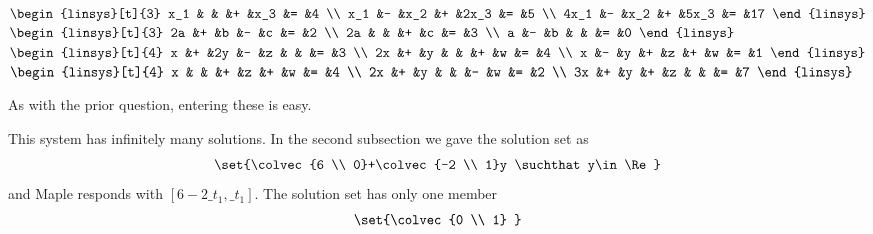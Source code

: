 \begin{exercises}
\begin{exparts*}
      \partsitem \( \begin{linsys}[t]{3}
                   x_1  &   &     &+  &x_3   &=  &4  \\
                   x_1  &-  &x_2  &+  &2x_3  &=  &5  \\
                  4x_1  &-  &x_2  &+  &5x_3  &=  &17  
                   \end{linsys}  \)
      \partsitem \( \begin{linsys}[t]{3}
                   2a   &+  &b    &-  &c     &=  &2  \\
                   2a   &   &     &+  &c     &=  &3  \\
                    a   &-  &b    &   &      &=  &0   
                    \end{linsys}  \)
      \partsitem \( \begin{linsys}[t]{4}
                     x  &+  &2y   &-   &z   &    &    &=  &3  \\
                    2x  &+  &y    &    &    &+   &w   &=  &4  \\
                     x  &-  &y    &+   &z   &+   &w   &=  &1  
                    \end{linsys}  \)
      \partsitem \( \begin{linsys}[t]{4}
                     x  &   &     &+   &z   &+   &w   &=  &4  \\
                    2x  &+  &y    &    &    &-   &w   &=  &2  \\
                    3x  &+  &y    &+   &z   &    &    &=  &7  
                     \end{linsys}  \)
    \end{exparts*}
    \begin{answer}
      As with the prior question, entering these is easy.
      \begin{exparts}
        \partsitem This system has infinitely many solutions. 
              In the second subsection we gave the solution set as
              \begin{equation*}
              \set{\colvec{6 \\ 0}+\colvec{-2 \\ 1}y
                      \suchthat y\in\Re}
              \end{equation*}
              and Maple responds with $[6-2\_t_1,\_t_1]$.
        \partsitem The solution set has only one member
          \begin{equation*}
             \set{\colvec{0 \\ 1} }

\end{equation*}
\end{exparts}
\end{answer}
\end{exercises}
